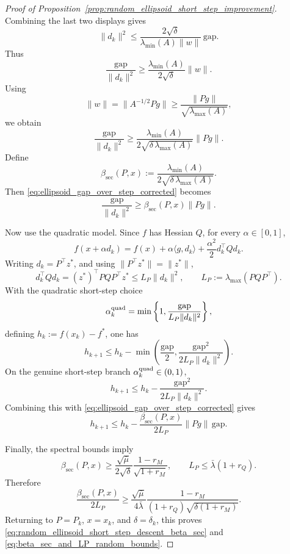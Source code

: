 \documentclass{article}
\begin{document}
\begin{proof}[Proof of Proposition~\ref{prop:random_ellipsoid_short_step_improvement}]
\[\]
Combining the last two displays gives
\[
\|d_k\|^2
\le
\frac{2\sqrt\delta}{\lambda_{\min}(A)\|w\|}\,\mathrm{gap}.
\]
Thus
\[
\frac{\mathrm{gap}}{\|d_k\|^2}
\ge
\frac{\lambda_{\min}(A)}{2\sqrt\delta}\|w\|.
\]
Using
\[
\|w\|=\|A^{-1/2}Pg\|
\ge
\frac{\|Pg\|}{\sqrt{\lambda_{\max}(A)}},
\]
we obtain
\begin{equation}
\frac{\mathrm{gap}}{\|d_k\|^2}
\ge
\frac{\lambda_{\min}(A)}
{2\sqrt{\delta\,\lambda_{\max}(A)}}\|Pg\|.
\label{eq:ellipsoid_gap_over_step_corrected}
\end{equation}
Define
\begin{equation}
\beta_{\mathrm{sec}}(P,x)
:=
\frac{\lambda_{\min}(A)}
{2\sqrt{\delta\,\lambda_{\max}(A)}}.
\label{eq:beta_sec_app}
\end{equation}
Then \eqref{eq:ellipsoid_gap_over_step_corrected} becomes
\[
\frac{\mathrm{gap}}{\|d_k\|^2}
\ge
\beta_{\mathrm{sec}}(P,x)\|Pg\|.
\]

Now use the quadratic model. Since \(f\) has Hessian \(Q\), for every
\(\alpha\in[0,1]\),
\[
f(x+\alpha d_k)
=
f(x)+\alpha\langle g,d_k\rangle
+\frac{\alpha^2}{2}d_k^\top Qd_k.
\]
Writing \(d_k=P^\top z^*\), and using \(\|P^\top z^*\|=\|z^*\|\),
\[
d_k^\top Qd_k
=
(z^*)^\top P QP^\top z^*
\le
L_P\|d_k\|^2,
\qquad
L_P:=\lambda_{\max}(PQP^\top).
\]
With the quadratic short-step choice
\[
\alpha_k^{\rm quad}
=
\min\left\{
1,
\frac{\mathrm{gap}}{L_P\|d_k\|^2}
\right\},
\]
defining $h_k:=f(x_k)-f^*$, one has
\[
h_{k+1}
\le
h_k
-
\min\left(
\frac{\mathrm{gap}}{2},
\frac{\mathrm{gap}^2}{2L_P\|d_k\|^2}
\right).
\]
On the genuine short-step branch \(\alpha_k^{\rm quad}\in(0,1)\),
\[
h_{k+1}
\le
h_k-\frac{\mathrm{gap}^2}{2L_P\|d_k\|^2}.
\]
Combining this with \eqref{eq:ellipsoid_gap_over_step_corrected} gives
\begin{equation}
h_{k+1}
\le
h_k
-
\frac{\beta_{\mathrm{sec}}(P,x)}{2L_P}\|Pg\|\,\mathrm{gap}.
\label{eq:ellipsoid_beta_sec_descent_app}
\end{equation}

Finally, the spectral bounds imply
\[
\beta_{\mathrm{sec}}(P,x)
\ge
\frac{\sqrt{\bar\mu}}{2\sqrt{\delta}}
\frac{1-r_M}{\sqrt{1+r_M}},
\qquad
L_P\le \bar\lambda(1+r_Q).
\]
Therefore
\[
\frac{\beta_{\mathrm{sec}}(P,x)}{2L_P}
\ge
\frac{\sqrt{\bar\mu}}{4\bar\lambda}
\frac{1-r_M}{(1+r_Q)\sqrt{\delta(1+r_M)}}.
\]
Returning to \(P=P_k\), \(x=x_k\), and \(\delta=\delta_k\), this proves
\eqref{eq:random_ellipsoid_short_step_descent_beta_sec} and
\eqref{eq:beta_sec_and_LP_random_bounds}.
\end{proof}
\end{document}

